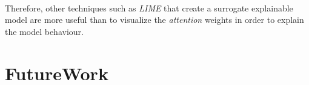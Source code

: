 \paragraph{}
Therefore, other techniques such as \emph{LIME} that create a surrogate explainable model are more useful than to visualize the \emph{attention} weights in order to explain the model behaviour.
\section{FutureWork}
\label{sec:FutureWork} 